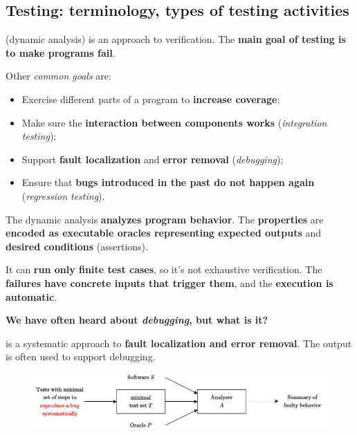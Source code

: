 \newpage

\subsection{Testing: terminology, types of testing activities}

 (dynamic analysis) is an approach to verification. The \textbf{main goal of testing is to make programs fail}.

Other \emph{common goals} are:
\begin{itemize}
    \item Exercise different parts of a program to \textbf{increase coverage};
    
    \item Make sure the \textbf{interaction between components works} (\emph{integration testing});
    
    \item Support \textbf{fault localization} and \textbf{error removal} (\emph{debugging});
    
    \item Ensure that \textbf{bugs introduced in the past do not happen again} (\emph{regression testing}).
\end{itemize}
The dynamic analysis \textbf{analyzes program behavior}. The \textbf{properties} are \textbf{encoded as executable oracles representing expected outputs} and \textbf{desired conditions} (assertions).

It can \textbf{run only finite test cases}, so it's not exhaustive verification. The \textbf{failures have concrete inputs that trigger them}, and the \textbf{execution is automatic}.

\begin{flushleft}
    \textcolor{Green3}{ \textbf{We have often heard about \emph{debugging}, but what is it?}}
\end{flushleft}
 is a systematic approach to \textbf{fault localization and error removal}. The output is often used to support debugging.

\begin{figure}[!htp]
    \centering
    \includegraphics[width=\textwidth]{img/testing-1.pdf}
\end{figure}

